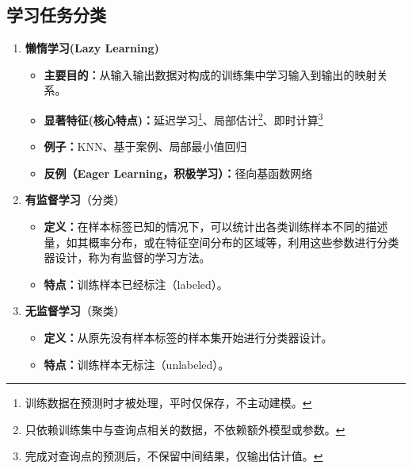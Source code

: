 \documentclass[../main.tex]{subfiles}
\begin{document}
\subsection{学习任务分类}\label{sec:ml-task-types}
\begin{enumerate}
    \item \textbf{懒惰学习(Lazy Learning)}
    \begin{itemize}
        \item \textbf{主要目的：}从输入输出数据对构成的训练集中学习输入到输出的映射关系。
        \item \textbf{显著特征(核心特点)：}延迟学习\footnote{训练数据在预测时才被处理，平时仅保存，不主动建模。}、局部估计\footnote{只依赖训练集中与查询点相关的数据，不依赖额外模型或参数。}、即时计算\footnote{完成对查询点的预测后，不保留中间结果，仅输出估计值。}
		\item \textbf{例子：}KNN、基于案例、局部最小值回归
		\item \textbf{反例（Eager Learning，积极学习）：}径向基函数网络
    \end{itemize}
    \item \textbf{有监督学习}（分类）
    \begin{itemize}
        \item \textbf{定义：}在样本标签已知的情况下，可以统计出各类训练样本不同的描述量，如其概率分布，或在特征空间分布的区域等，利用这些参数进行分类器设计，称为有监督的学习方法。
        \item \textbf{特点：}训练样本已经标注（labeled）。
    \end{itemize}
    \item \textbf{无监督学习}（聚类）
    \begin{itemize}
        \item \textbf{定义：}从原先没有样本标签的样本集开始进行分类器设计。
        \item \textbf{特点：}训练样本无标注（unlabeled）。
    \end{itemize}
\end{enumerate}
\end{document}

